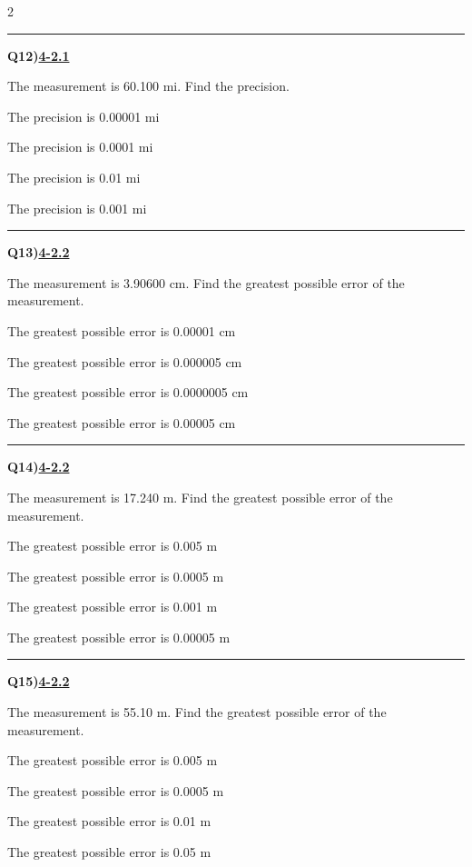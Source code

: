 \documentclass[11pt]{article}
\newenvironment{Qbox}[2]{%
  \par\medskip\noindent\begin{minipage}{\linewidth}%
  \hrule\medskip%
  \textbf{Q#1)}\hfill\textbf{\underline{#2}}\par\smallskip%
}{\par\end{minipage}\par\medskip}
\begin{document}
\begin{multicols}{2}
\begin{Qbox}{12}{4-2.1}
The measurement is 60.100 mi. Find the precision.
\begin{choices}
  \item The precision is 0.00001 mi
  \item The precision is 0.0001 mi
  \item The precision is 0.01 mi
  \item The precision is 0.001 mi
\end{choices}
\end{Qbox}

\begin{Qbox}{13}{4-2.2}
The measurement is 3.90600 cm. Find the greatest possible error of the measurement.
\begin{choices}
  \item The greatest possible error is 0.00001 cm
  \item The greatest possible error is 0.000005 cm
  \item The greatest possible error is 0.0000005 cm
  \item The greatest possible error is 0.00005 cm
\end{choices}
\end{Qbox}

\begin{Qbox}{14}{4-2.2}
The measurement is 17.240 m. Find the greatest possible error of the measurement.
\begin{choices}
  \item The greatest possible error is 0.005 m
  \item The greatest possible error is 0.0005 m
  \item The greatest possible error is 0.001 m
  \item The greatest possible error is 0.00005 m
\end{choices}
\end{Qbox}

\begin{Qbox}{15}{4-2.2}
The measurement is 55.10 m. Find the greatest possible error of the measurement.
\begin{choices}
  \item The greatest possible error is 0.005 m
  \item The greatest possible error is 0.0005 m
  \item The greatest possible error is 0.01 m
  \item The greatest possible error is 0.05 m
\end{choices}
\end{Qbox}


\end{multicols}
\end{document}
